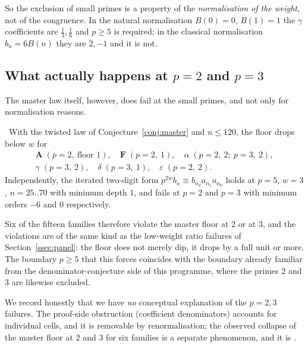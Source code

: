 So the exclusion of small primes is a property of the \emph{normalisation of the weight},
not of the congruence. In the natural normalisation $B(0)=0$, $B(1)=1$ the $\gamma$
coefficients are $\frac13,\frac16$ and $p\ge5$ is required; in the classical
normalisation $b_n=6B(n)$ they are $2,-1$ and it is not.

\subsection{What actually happens at \texorpdfstring{$p=2$ and $p=3$}{p = 2 and p = 3}}

The master law itself, however, does fail at the small primes, and not only for
normalisation reasons.

\begin{observation}\label{obs:small-primes}
\Verified\ With the twisted law of Conjecture~\ref{conj:master} and $n\le120$, the floor
drops below $w$ for
\[
 \begin{gathered}
   \mathbf A\;(p=2,\ \text{floor }1),\quad
   \mathbf F\;(p=2,\ 1),\quad
   \alpha\;(p=2,\ 2;\ p=3,\ 2),\\
   \gamma\;(p=3,\ 2),\quad
   \delta\;(p=3,\ 1),\quad
   \varepsilon\;(p=2,\ 2).
 \end{gathered}
\]
Independently, the iterated two-digit form $p^{2w}b_n\equiv b_{n_2}a_{n_1}a_{n_0}$ holds
at $p=5$, $w=3$, $n=25..70$ with minimum depth $1$, and fails at $p=2$ and $p=3$ with
minimum orders $-6$ and $0$ respectively.
\end{observation}

Six of the fifteen families therefore violate the master floor at $2$ or at $3$, and the
violations are of the same kind as the low-weight ratio failures of
Section~\ref{ssec:panel}: the floor does not merely dip, it drops by a full unit or more.
The boundary $p\ge5$ that this forces coincides with the boundary already familiar from
the denominator-conjecture side of this programme, where the primes $2$ and $3$ are
likewise excluded.

We record honestly that we have \emph{no} conceptual explanation of the $p=2,3$ failures.
The proof-side obstruction (coefficient denominators) accounts for individual cells, and
it is removable by renormalisation; the observed collapse of the master floor at $2$ and
$3$ for six families is a separate phenomenon, and it is \Open.
